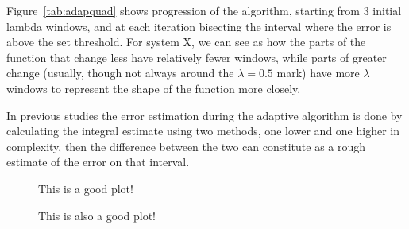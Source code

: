 Figure~\ref{tab:adapquad}  shows progression of the algorithm,
starting from 3 initial lambda windows, and at each iteration bisecting the
interval where the error is above the set threshold. For system X, we can see
as how the parts of the function that change less have relatively fewer
windows, while parts of greater change (usually, though not always around the
$\lambda=0.5$ mark) have more $\lambda$ windows to represent the shape of the
function more closely.

 In previous studies \cite{} the
error estimation during the adaptive algorithm is done by calculating the
integral estimate using two methods, one lower and one higher in complexity,
then the difference between the two can constitute as a rough estimate of the
error on that interval.

\begin{figure}
  
  \caption{This is a good plot!}
  \label{fig:adapconv}
\end{figure}

\begin{figure}
  
  \caption{This is also a good plot!}
  \label{fig:savings}
\end{figure}
